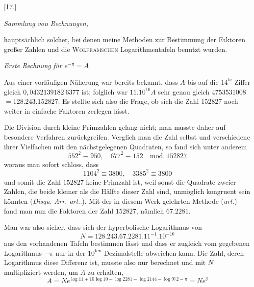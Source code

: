 \begingroup
\renewcommand{\arraystretch}{1.45}
\newcommand{\GaussIIITranscriptionDigits}[1]{\text{\ttfamily #1}}

\par\medskip{}\centerline{[17.]}

\begin{center}\textit{Sammlung von Rechnungen,}\end{center}
hauptsächlich solcher, bei denen meine Methoden zur Bestimmung der Faktoren
großer Zahlen und die \textsc{Wolframschen} Logarithmentafeln benutzt wurden.

\begin{center}\textit{Erste Rechnung für $e^{-\pi}=A$}\end{center}

Aus einer vorläufigen Näherung war bereits bekannt, dass $A$ bis auf die
$14^{\mathrm{te}}$ Ziffer gleich $0,0432139182\ 6377$ ist; folglich war $11.10^{10}A$ sehr genau gleich $4753531008$
$=128.243.152827$. Es stellte sich also die Frage, ob sich die Zahl $152827$ noch weiter in einfache
Faktoren zerlegen lässt.

Die Division durch kleine Primzahlen gelang nicht; man musste daher
auf besondere Verfahren zurückgreifen. Verglich man die Zahl selbst und
verschiedene ihrer Vielfachen mit den nächstgelegenen Quadraten, so fand sich
unter anderem
\[
552^2\equiv950,\quad677^2\equiv152\quad\mathrm{mod.}\ 152827
\]
woraus man sofort schloss, dass
\[
1104^2\equiv3800,\quad3385^2\equiv3800
\]
und somit die Zahl $152827$ keine Primzahl ist, weil sonst die Quadrate zweier
Zahlen, die beide kleiner als die Hälfte dieser Zahl sind, unmöglich kongruent
sein könnten (\textit{Disqu. Arr. art.}\quad.). Mit der in diesem Werk gelehrten Methode
(\textit{art.}\quad) fand man nun die Faktoren der Zahl $152827$, nämlich $67.2281$.

Man war also sicher, dass sich der hyperbolische Logarithmus von
\[
N=128.243.67.2281.11^{-1}.10^{-10}
\]
aus den vorhandenen Tafeln bestimmen lässt und dass er zugleich vom gegebenen
Logarithmus $-\pi$ nur in der $10^{\mathrm{ten}}$ Dezimalstelle abweichen kann.
Die Zahl, deren Logarithmus diese Differenz ist, musste also nur berechnet
und mit $N$ multipliziert werden, um $A$ zu erhalten,
\[
A=Ne^{\log11+10\log10-\log2281-\log2144-\log972-\pi}=Ne^\delta
\]

